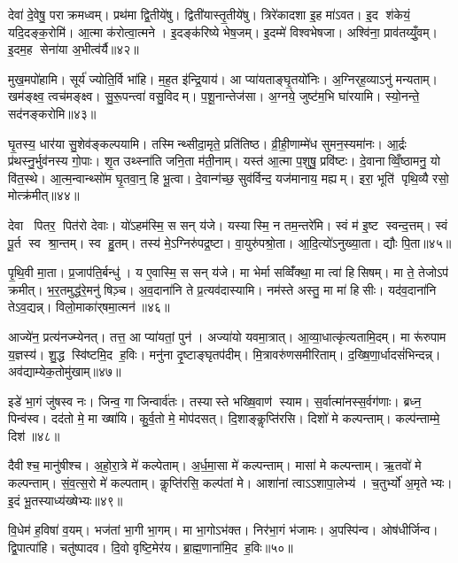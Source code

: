 देवा॑ दे॒वेषु॒ पराक्रमध्वम्। प्रथ॑मा द्वि॒तीये॑षु। द्विती॑यास्तृ॒तीये॑षु। त्रिरे॑कादशा इ॒ह मा॑ऽवत। इ॒द श॑केयं॒ यदि॒दङ्क॒रोमि॑। आ॒त्मा क॑रोत्वा॒त्मने। इ॒दङ्क॑रिष्ये भेष॒जम्। इ॒दम्मे॑ विश्वभेषजा। अश्वि॑ना॒ प्राव॑तय्युँ॒वम्। इ॒दम॒ह सेना॑या अ॒भीत्व॑र्यै॥४२॥

मुख॒मपो॑हामि। सूर्य॑ ज्योति॒र्वि भा॑हि। म॒ह॒त इ॑न्द्रि॒याय॑। आ प्या॑यताङ्घृ॒तयो॑निः। अ॒ग्निर्‌ह॒व्याऽनु॑ मन्यताम्। खम॑ङ्क्ष्व॒ त्वच॑मङ्क्ष्व। सु॒रू॒पन्त्वा॑ वसु॒विदम्। प॒शू॒नान्तेज॑सा। अ॒ग्नये॒ जुष्ट॑म॒भि घा॑रयामि। स्यो॒नन्ते॒ सद॑नङ्करोमि॥४३॥

घृ॒तस्य॒ धार॑या सु॒शेव॑ङ्कल्पयामि। तस्मिन्थ्सीदा॒मृते॒ प्रति॑तिष्ठ। व्री॒ही॒णाम्मे॑ध सुमन॒स्यमा॑नः। आ॒र्द्रः प्र॑थस्नु॒र्भुव॑नस्य गो॒पाः। शृ॒त उथ्स्ना॑ति जनि॒ता म॑ती॒नाम्। यस्त॑ आ॒त्मा प॒शुषु॒ प्रवि॑ष्टः। दे॒वानाव्विँ॒ष्ठामनु॒ यो वि॑त॒स्थे। आ॒त्म॒न्वान्थ्सो॑म घृ॒तवा॒न्॒ हि भू॒त्वा। दे॒वान्ग॑च्छ॒ सुव॑र्विन्द॒ यज॑मानाय॒ मह्यम्। इरा॒ भूति॑ पृथि॒व्यै रसो॒ मोत्क्र॑मीत्॥४४॥

देवा पितर॒ पित॑रो देवाः। यो॑ऽहम॑स्मि॒ स सन् य॑जे। यस्यास्मि॒ न तम॒न्तरे॑मि। स्वं म॑ इ॒ष्ट स्वन्द॒त्तम्। स्वं पू॒र्त स्व श्रा॒न्तम्। स्व हु॒तम्। तस्य॑ मे॒ऽग्निरु॑पद्र॒ष्टा। वा॒युरु॑पश्रो॒ता। आ॒दि॒त्यो॑ऽनुख्या॒ता। द्यौः पि॒ता॥४५॥

पृ॒थि॒वी मा॒ता। प्र॒जाप॑ति॒र्बन्धु॑। य ए॒वास्मि॒ स सन् य॑जे। मा भेर्मा सव्विँ॑क्था॒ मा त्वा॑ हिसिषम्। मा ते॒ तेजोऽप॑ क्रमीत्। भ॒र॒तमुद्ध॑रे॒मनु॑ षिञ़्च। अ॒व॒दाना॑नि ते प्र॒त्यव॑दास्यामि। नम॑स्ते अस्तु॒ मा मा॑ हिसीः। यद॑व॒दाना॑नि तेऽव॒द्यन्न्। विलो॒माका॑र्‌षमा॒त्मन॑॥४६॥

आज्ये॑न॒ प्रत्य॑नज्म्येनत्। तत्त॒ आ प्या॑यतां॒ पुन॑। अज्या॑यो यवमा॒त्रात्। आ॒व्या॒धात्कृ॑त्यतामि॒दम्। मा रू॑रुपाम य॒ज्ञस्य॑। शु॒द्ध स्वि॑ष्टमि॒द ह॒विः। मनु॑ना दृ॒ष्टाङ्घृतप॑दीम्। मि॒त्रावरु॑णसमीरिताम्। द॒ख्षि॒णा॒र्धादसं॑भिन्दन्न्। अव॑द्याम्येक॒तोमु॑खाम्॥४७॥

इडे॑ भा॒गं जु॑षस्व नः। जिन्व॒ गा जिन्वार्व॑तः। तस्यास्ते भख्षि॒वाण॑ स्याम। स॒र्वात्मा॑नस्स॒र्वग॑णाः। ब्रध्न॒ पिन्व॑स्व। दद॑तो मे॒ मा ख्षा॑यि। कु॒र्व॒तो मे॒ मोप॑दसत्। दि॒शाङ्कॢप्ति॑रसि। दिशो॑ मे कल्पन्ताम्। कल्प॑न्ताम्मे॒ दिश॑॥४८॥

दैवीश्च॒ मानु॑षीश्च। अ॒हो॒रा॒त्रे मे॑ कल्पेताम्। अ॒र्ध॒मा॒सा मे॑ कल्पन्ताम्। मासा॑ मे कल्पन्ताम्। ऋ॒तवो॑ मे कल्पन्ताम्। सं॒व॒त्स॒रो मे॑ कल्पताम्। कॢप्ति॑रसि॒ कल्प॑तां मे। आशा॑नां त्वाऽऽशापा॒लेभ्य॑। च॒तुर्भ्यो॑ अ॒मृतेभ्यः। इ॒दं भू॒तस्याध्य॑ख्षेभ्यः॥४९॥

वि॒धेम॑ ह॒विषा॑ व॒यम्। भज॑तां भा॒गी भा॒गम्। मा भा॒गोऽभ॑क्त। निर॑भा॒गं भ॑जामः। अ॒पस्पि॑न्व। ओष॑धीर्जिन्व। द्वि॒पात्पा॑हि। चतु॑ष्पादव। दि॒वो वृष्टि॒मेर॑य। ब्रा॒ह्म॒णाना॑मि॒द ह॒विः॥५०॥

